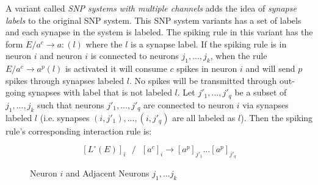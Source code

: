 \documentclass[a4paper]{article}
\theoremstyle{definition}
\newcommand{\ra}{\rightarrow}
\newcommand{\ts}{\text{ }}
\begin{document}
A variant called \emph{SNP systems with multiple channels} \cite{peng-2017-multiple-channels} adds 
the idea of \emph{synapse labels} to the original SNP system. This SNP system variants has a set of
labels and each synapse in the system is labeled. The spiking rule in this variant has the form
$E/a^c \ra a: (l)$ where the $l$ is a synapse label. If the spiking rule is in neuron $i$ and neuron
$i$ is connected to neurons $j_1,...,j_k$, when the rule $E/a^c \ra a^p (l)$ is activated it will
consume $c$ spikes in neuron $i$ and will send $p$ spikes through synapses labeled $l$. No spikes
will  be transmitted through out-going synapses with label that is not labeled $l$. Let 
${j'_1,...,j'_q}$ be a subset of ${j_1,...,j_k}$ such that neurons $j'_1,...,j'_q$ are connected to
neuron $i$ via synapses labeled $l$ (i.e. synapses $(i, j'_1),...,(i,j'_q)$ are all labeled as $l$).
Then the spiking rule's corresponding interaction rule is:

$${[L^{\circ}(E)]}_{i}\ts/\ts {[a^c]}_i \ra {[a^p]}_{j'_1}...{[a^p]}_{j'_{q}}$$

\begin{figure}[H]
\begin{center}                                                                                           
\end{center}                                                                                             
\caption{Neuron $i$ and Adjacent Neurons $j_1,...j_k$}\label{fig-snp2}
\end{figure} 
\end{document}
